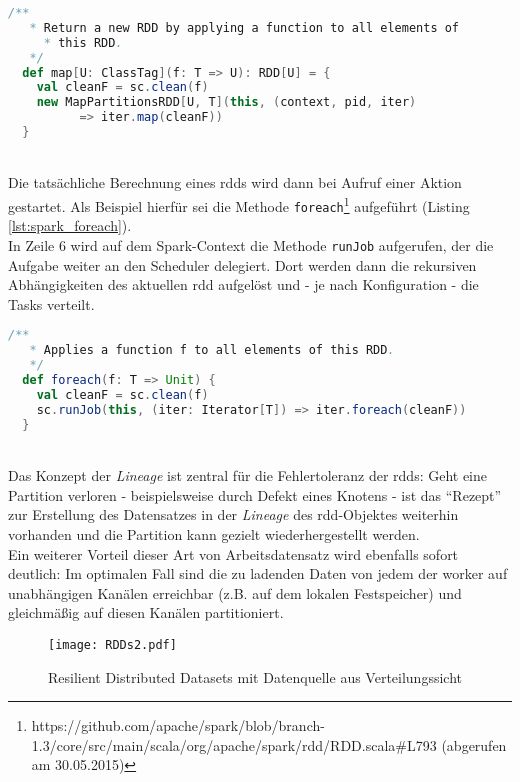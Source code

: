 \begin{lstlisting}[language=Scala,caption={Map-Methode aus org.apache.spark.rdd.RDD v1.3.0},label={lst:spark_map}]
  /**
   * Return a new RDD by applying a function to all elements of 
	 * this RDD.
   */
  def map[U: ClassTag](f: T => U): RDD[U] = {
    val cleanF = sc.clean(f)
    new MapPartitionsRDD[U, T](this, (context, pid, iter) 
		  => iter.map(cleanF))
  }
\end{lstlisting}
\\
Die tatsächliche Berechnung eines \glspl{rdd} wird dann bei Aufruf einer Aktion gestartet. Als Beispiel hierfür sei die Methode \lstinline|foreach|\footnote{https://github.com/apache/spark/blob/branch-1.3/core/src/main/scala/org/apache/spark/rdd/RDD.scala#L793 (abgerufen am 30.05.2015)} aufgeführt (Listing \ref{lst:spark_foreach}).\\
In Zeile 6 wird auf dem Spark-Context die Methode \lstinline|runJob| aufgerufen, der die Aufgabe weiter an den Scheduler delegiert. Dort werden dann die rekursiven Abhängigkeiten des aktuellen \gls{rdd} aufgelöst und - je nach Konfiguration - die Tasks verteilt.\\

\begin{lstlisting}[language=Scala,caption={foreach-Methode aus org.apache.spark.rdd.RDD v1.3.0},label={lst:spark_foreach}]
  /**
   * Applies a function f to all elements of this RDD.
   */
  def foreach(f: T => Unit) {
    val cleanF = sc.clean(f)
    sc.runJob(this, (iter: Iterator[T]) => iter.foreach(cleanF))
  }
\end{lstlisting}
\\
Das Konzept der \textit{Lineage} ist zentral für die Fehlertoleranz der \gls{rdd}s:
Geht eine Partition verloren - beispielsweise durch Defekt eines Knotens - ist das "`Rezept"' zur Erstellung des Datensatzes in der \textit{Lineage} des \gls{rdd}-Objektes weiterhin vorhanden und die Partition kann gezielt wiederhergestellt werden.\\

Ein weiterer Vorteil dieser Art von Arbeitsdatensatz wird ebenfalls sofort deutlich: Im optimalen Fall sind die zu ladenden Daten von jedem der \gls{worker} auf unabhängigen Kanälen erreichbar (z.B. auf dem lokalen Festspeicher) und gleichmäßig auf diesen Kanälen partitioniert.\\

\begin{figure}[h!]
	\centering
  \texttt{[image: RDDs2.pdf]}
	\caption{Resilient Distributed Datasets mit Datenquelle aus Verteilungssicht}
	\label{fig:rdds2}
\end{figure}

